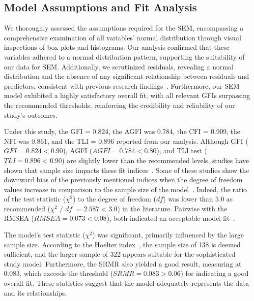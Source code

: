 \subsection{Model Assumptions and Fit Analysis}
\label{chap:app002004001}

\textcolor{revised}{We thoroughly assessed the assumptions required for the \acf{SEM}, encompassing a comprehensive examination of all variables' normal distribution through visual inspections of box plots and histograms.
Our analysis confirmed that these variables adhered to a normal distribution pattern, supporting the suitability of our data for \ac{SEM}.
Additionally, we scrutinized residuals, revealing a normal distribution and the absence of any significant relationship between residuals and predictors, consistent with previous research findings~\cite{CALISTO2022102922}.
Furthermore, our \ac{SEM} model exhibited a highly satisfactory overall fit, with all relevant \acfp{GFI} surpassing the recommended thresholds, reinforcing the credibility and reliability of our study's outcomes.}

Under this study, the \ac{GFI} = 0.824, the \ac{AGFI} was 0.784, the \ac{CFI} = 0.909, the \ac{NFI} was 0.861, and the \ac{TLI} = 0.896 reported from our analysis.
Although \ac{GFI} ($GFI = 0.824 < 0.90$), \ac{AGFI} ($AGFI = 0.784 < 0.80$), and \ac{TLI} test ($TLI = 0.896 < 0.90$) are slightly lower than the recommended levels, studies have shown that sample size impacts these fit indices~\cite{KHALILZADEH2017460, doi:10.1080/00273171.2019.1602503, ZHOU2010760}.
Some of these studies show the downward bias of the previously mentioned indices when the degree of freedom values increase in comparison to the sample size of the model~\cite{doi:10.1080/00273171.2019.1602503}.
Indeed, the ratio of the test statistic ($\chi^2$) to the degree of freedom ($df$) was lower than 3.0 as recommended ($\chi^2$ / $df$ $= 2.587 < 3.0$) in the literature.
Pairwise with the \ac{RMSEA} ($RMSEA = 0.073 < 0.08$), both indicated an acceptable model fit~\cite{ZHOU2010760}.

\textcolor{revised}{The model's test statistic ($\chi^2$) was significant, primarily influenced by the large sample size.
According to the Hoelter index~\cite{CALISTO2022102922}, the sample size of 138 is deemed sufficient, and the larger sample of 322 appears suitable for the sophisticated study model.
Furthermore, the \ac{SRMR} also yielded a good result, measuring at 0.083, which exceeds the threshold ($SRMR = 0.083 > 0.06$) for indicating a good overall fit.
These statistics suggest that the model adequately represents the data and its relationships.}

